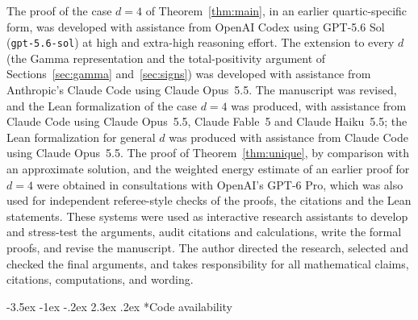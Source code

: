 \documentclass[twoside,10pt]{article}
\makeatletter
\numberwithin{equation}{section}
\theoremstyle{slbody}
\theoremstyle{remark}
\renewcommand{\section}{%
  \@startsection{section}{1}{\z@}%
    {-3.5ex \@plus -1ex \@minus -.2ex}%
    {2.3ex \@plus .2ex}%
    {\normalfont\large\bfseries}}
\makeatother
\begin{document}
The proof of the case \(d=4\) of Theorem~\ref{thm:main}, in an earlier
quartic-specific form, was developed with assistance from OpenAI Codex
using GPT-5.6 Sol (\texttt{gpt-5.6-sol}) at high and extra-high reasoning
effort.  The extension to every \(d\) (the Gamma representation and the
total-positivity argument of Sections~\ref{sec:gamma}
and~\ref{sec:signs}) was developed with assistance from Anthropic's
Claude Code using Claude Opus~5.5.  The manuscript was revised, and the
Lean formalization of the case \(d=4\) was produced, with assistance
from Claude Code using Claude Opus~5.5, Claude Fable~5 and Claude
Haiku~5.5; the Lean formalization for general \(d\) was produced with
assistance from Claude Code using Claude Opus~5.5.  The proof of Theorem~\ref{thm:unique}, by comparison
with an approximate solution, and the weighted energy estimate of an
earlier proof for \(d=4\) were obtained in consultations with OpenAI's
GPT-6 Pro, which was also used for independent referee-style checks of
the proofs, the citations and the Lean statements.  These systems were
used as interactive research assistants to develop and stress-test the
arguments, audit citations and calculations, write the formal proofs,
and revise the manuscript.  The author directed the research, selected
and checked the final arguments, and takes responsibility for all
mathematical claims, citations, computations, and wording.

\section*{Code availability}
\end{document}
